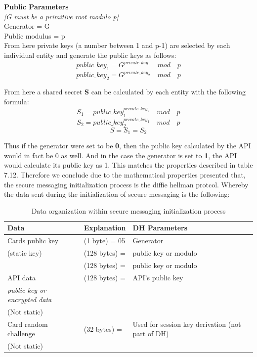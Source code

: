 \documentclass[bsc,frontabs,twoside,singlespacing,parskip,deptreport]{infthesis}     %
\begin{document}
\textbf{Public Parameters}\\
\textit{[G must be a primitive root modulo p]}\\
Generator = G\\
Public modulus = p\\
 

From here private keys (a number between 1 and p-1) are selected by each individual entity and generate the public keys as follows:
$$ public\_key_1 = G ^{private\_key_1} \quad mod \quad p $$
$$ public\_key_2 = G ^{private\_key_2} \quad mod \quad p $$

From here a shared secret \textbf{S} can be calculated by each entity with the following formula:\\
$$ S_1 = public\_key_1 ^ {private\_key_2} \quad mod \quad p $$
$$ S_2 = public\_key_2 ^ {private\_key_1} \quad mod \quad p $$
$$ S = S_1 = S_2 $$

Thus if the generator were set to be \textbf{0}, then the public key calculated by the API would in fact be 0 as well. And in the case the generator is set to \textbf{1}, the API would calculate its public key as 1. This matches the properties described in table 7.12. Therefore we conclude due to the mathematical properties presented that, the secure messaging initialization process is the diffie hellman protcol. Whereby the data sent during the initialization of secure messaging is the following:

\begin{table}[H]
\hskip-1.3cm\begin{tabular}{|l|l|l|}
\hline
Data & Explanation & DH Parameters\\
\hline
Cards public key & (1 byte) = 05 & Generator\\
(static key)    & (128 bytes) =  & public key or modulo\\
                 & (128 bytes) = & public key or modulo\\
\hline
API data & (128 bytes) = & API's public key\\
\textit{public key or encrypted data} & &\\
(Not static) & & \\
\hline
Card random challenge & (32 bytes) = & Used for session key derivation (not part of DH)\\
(Not static) & & \\
\hline
\end{tabular}
\caption{Data organization within secure messaging initialization process}
\end{table}
\end{document}
